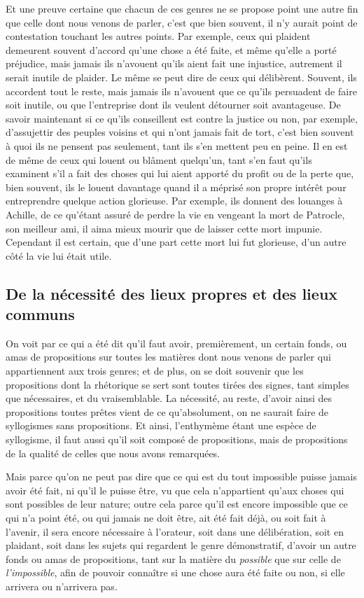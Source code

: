 Et une preuve certaine que chacun de ces genres ne se propose point une autre fin que celle dont nous venons de parler,
c'est que bien souvent, il n'y aurait point de contestation touchant les autres points. Par exemple, ceux qui plaident
demeurent souvent d'accord qu'une chose a été faite, et même qu'elle a porté préjudice, mais jamais ils n'avouent qu'ils
aient fait une injustice, autrement il serait inutile de plaider. Le même se peut dire de ceux qui délibèrent. Souvent,
ils accordent tout le reste, mais jamais ils n'avouent que ce qu'ils persuadent de faire soit inutile, ou que l'entreprise
dont ils veulent détourner soit avantageuse. De savoir maintenant si ce qu'ils conseillent est contre la justice ou non,
par exemple, d'assujettir des peuples voisins et qui n'ont jamais fait de tort, c'est bien souvent à quoi ils ne pensent
pas seulement, tant ils s'en mettent peu en peine. Il en est de même de ceux qui louent ou blâment quelqu'un, tant s'en
faut qu'ils examinent s'il a fait des choses qui lui aient apporté du profit ou de la perte que, bien souvent, ils le
louent davantage quand il a méprisé son propre intérêt pour entreprendre quelque action glorieuse. Par exemple, ils
donnent des louanges à Achille, de ce qu'étant assuré de perdre la vie en vengeant la mort de Patrocle, son meilleur ami,
il aima mieux mourir que de laisser cette mort impunie. Cependant il est certain, que d'une part cette mort lui fut
glorieuse, d'un autre côté la vie lui était utile.

\subsection{De la nécessité des lieux propres et des lieux communs}

On voit par ce qui a été dit qu'il faut avoir, premièrement, un certain fonds, ou amas de propositions sur toutes les matières
dont nous venons de parler qui appartiennent aux trois genres; et de plus, on se doit souvenir que les propositions dont la
rhétorique se sert sont toutes tirées des signes, tant simples que nécessaires, et du vraisemblable. La nécessité, au reste,
d'avoir ainsi des propositions toutes prêtes vient de ce qu'absolument, on ne saurait faire de syllogismes sans propositions.
Et ainsi, l'enthymème étant une espèce de syllogisme, il faut aussi qu'il soit composé de propositions, mais de propositions
de la qualité de celles que nous avons remarquées.

\bigbreak

Mais parce qu'on ne peut pas dire que ce qui est du tout impossible puisse jamais avoir été fait, ni qu'il le puisse être, vu
que cela n'appartient qu'aux choses qui sont possibles de leur nature; outre cela parce qu'il est encore impossible que ce qui
n'a point été, ou qui jamais ne doit être, ait été fait déjà, ou soit fait à l'avenir, il sera encore nécessaire à l'orateur,
soit dans une délibération, soit en plaidant, soit dans les sujets qui regardent le genre démonstratif, d'avoir un autre fonds
ou amas de propositions, tant sur la matière du \emph{possible} que sur celle de \emph{l'impossible}, afin de pouvoir connaître
si une chose aura été faite ou non, si elle arrivera ou n'arrivera pas.

